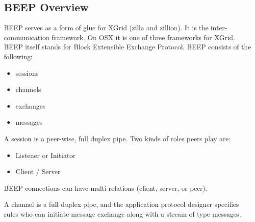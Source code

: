 \documentclass[11pt]{article}
\begin{document}
%
%
%
\newpage
\begin{Large}
\subsection{BEEP Overview}
BEEP serves as a form of glue for XGrid (zilla and zillion).  It is the inter-communication framework.  On OSX it is one of three frameworks for XGrid.  BEEP itself stands for Block Extensible Exchange Protocol.  %
BEEP consists of the following: 
\begin{itemize}
\item sessions
\item channels
\item exchanges
\item messages
\end{itemize}
\cite{m_rose} 
A session is a peer-wise, full duplex pipe.  Two kinds of roles peers play are:
\begin{itemize}
\item Listener or Initiator 
\item Client / Server
\end{itemize}
BEEP connections can have multi-relations (client, server, or peer).

A channel is a full duplex pipe, and the application protocol designer specifies rules who can initiate message exchange along with a stream of type messages.  
\end{Large}
\end{document}
